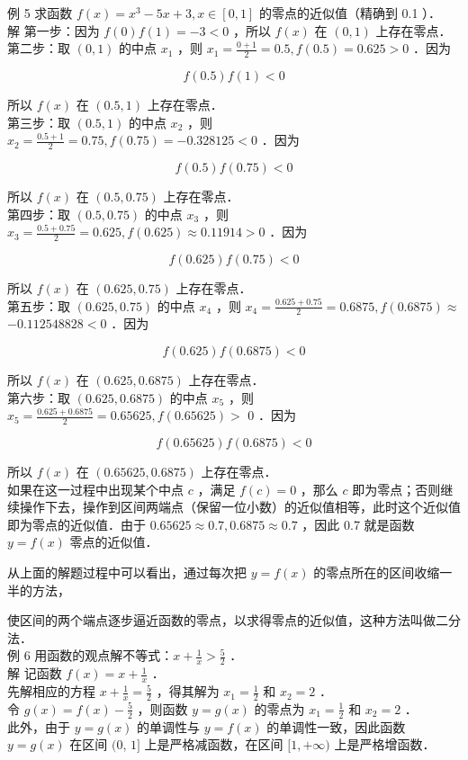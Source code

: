 \documentclass[10pt]{article}
\begin{document}
例 5 求函数 \(f(x)=x^{3}-5 x+3, x \in[0,1]\) 的零点的近似值（精确到 0.1 ）．\\
解 第一步：因为 \(f(0) f(1)=-3<0\) ，所以 \(f(x)\) 在 \((0,1)\) 上存在零点．\\
第二步：取 \((0,1)\) 的中点 \(x_{1}\) ，则 \(x_{1}=\frac{0+1}{2}=0.5, f(0.5)=0.625>0\) ．因为

\[
f(0.5) f(1)<0
\]

所以 \(f(x)\) 在 \((0.5,1)\) 上存在零点．\\
第三步：取 \((0.5,1)\) 的中点 \(x_{2}\) ，则 \(x_{2}=\frac{0.5+1}{2}=0.75, f(0.75)=-0.328125<0\) ．因为

\[
f(0.5) f(0.75)<0
\]

所以 \(f(x)\) 在 \((0.5,0.75)\) 上存在零点．\\
第四步：取 \((0.5,0.75)\) 的中点 \(x_{3}\) ，则 \(x_{3}=\frac{0.5+0.75}{2}=0.625, f(0.625) \approx 0.11914>0\) ．因为

\[
f(0.625) f(0.75)<0
\]

所以 \(f(x)\) 在 \((0.625,0.75)\) 上存在零点．\\
第五步：取 \((0.625,0.75)\) 的中点 \(x_{4}\) ，则 \(x_{4}=\frac{0.625+0.75}{2}=0.6875, f(0.6875) \approx\) \(-0.112548828<0\) ．因为

\[
f(0.625) f(0.6875)<0
\]

所以 \(f(x)\) 在 \((0.625,0.6875)\) 上存在零点．\\
第六步：取 \((0.625,0.6875)\) 的中点 \(x_{5}\) ，则 \(x_{5}=\frac{0.625+0.6875}{2}=0.65625, f(0.65625)>\) 0 ．因为

\[
f(0.65625) f(0.6875)<0
\]

所以 \(f(x)\) 在 \((0.65625,0.6875)\) 上存在零点．\\
如果在这一过程中出现某个中点 \(c\) ，满足 \(f(c)=0\) ，那么 \(c\) 即为零点；否则继续操作下去，操作到区间两端点（保留一位小数）的近似值相等，此时这个近似值即为零点的近似值．由于 \(0.65625 \approx 0.7,0.6875 \approx 0.7\) ，因此 0.7 就是函数 \(y=f(x)\) 零点的近似值．

从上面的解题过程中可以看出，通过每次把 \(y=f(x)\) 的零点所在的区间收缩一半的方法，

使区间的两个端点逐步逼近函数的零点，以求得零点的近似值，这种方法叫做二分法．\\
例 6 用函数的观点解不等式：\(x+\frac{1}{x}>\frac{5}{2}\) ．\\
解 记函数 \(f(x)=x+\frac{1}{x}\) ．\\
先解相应的方程 \(x+\frac{1}{x}=\frac{5}{2}\) ，得其解为 \(x_{1}=\frac{1}{2}\) 和 \(x_{2}=2\) ．\\
令 \(g(x)=f(x)-\frac{5}{2}\) ，则函数 \(y=g(x)\) 的零点为 \(x_{1}=\frac{1}{2}\) 和 \(x_{2}=2\) ．\\
此外，由于 \(y=g(x)\) 的单调性与 \(y=f(x)\) 的单调性一致，因此函数 \(y=g(x)\) 在区间 \((0\), \(1]\) 上是严格减函数，在区间 \([1,+\infty)\) 上是严格增函数．
\end{document}
